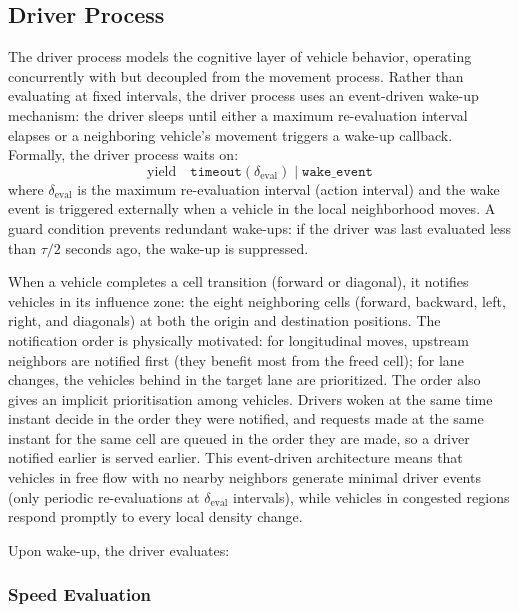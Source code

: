 \documentclass[review,number]{elsarticle}
\begin{document}
\subsection{Driver Process}
\label{sec:driver}

The driver process models the cognitive layer of vehicle behavior, operating concurrently with but decoupled from the movement process. Rather than evaluating at fixed intervals, the driver process uses an event-driven wake-up mechanism: the driver sleeps until either a maximum re-evaluation interval elapses or a neighboring vehicle's movement triggers a wake-up callback. Formally, the driver process waits on:
\begin{equation}
    \text{yield} \quad \texttt{timeout}(\delta_{\text{eval}}) \;\big|\; \texttt{wake\_event}
    \label{eq:driver_yield}
\end{equation}
where $\delta_{\text{eval}}$ is the maximum re-evaluation interval (action interval) and the wake event is triggered externally when a vehicle in the local neighborhood moves. A guard condition prevents redundant wake-ups: if the driver was last evaluated less than $\tau/2$ seconds ago, the wake-up is suppressed.

When a vehicle completes a cell transition (forward or diagonal), it notifies vehicles in its influence zone: the eight neighboring cells (forward, backward, left, right, and diagonals) at both the origin and destination positions. The notification order is physically motivated: for longitudinal moves, upstream neighbors are notified first (they benefit most from the freed cell); for lane changes, the vehicles behind in the target lane are prioritized. The order also gives an implicit prioritisation among vehicles. Drivers woken at the same time instant decide in the order they were notified, and requests made at the same instant for the same cell are queued in the order they are made, so a driver notified earlier is served earlier. This event-driven architecture means that vehicles in free flow with no nearby neighbors generate minimal driver events (only periodic re-evaluations at $\delta_{\text{eval}}$ intervals), while vehicles in congested regions respond promptly to every local density change.

Upon wake-up, the driver evaluates:

\subsubsection{Speed Evaluation}
\label{sec:speed_eval}
\end{document}
